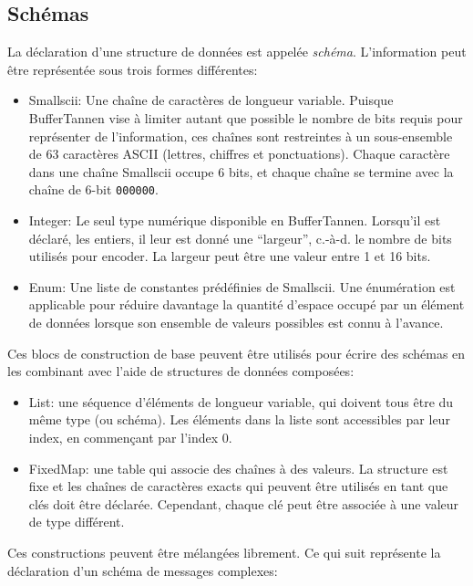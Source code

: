 \subsection{Schémas}
\setcounter{paragraph}{0}

La déclaration d'une structure de données est appelée \emph{schéma}. L'information peut être représentée sous trois formes différentes:

\begin{itemize}
\item Smallscii: Une chaîne de caractères de longueur variable. Puisque BufferTannen vise à limiter autant que possible le nombre de bits requis pour représenter de l'information, ces chaînes sont restreintes à un sous-ensemble de 63 caractères ASCII (lettres, chiffres et ponctuations). Chaque caractère dans une chaîne Smallscii occupe 6 bits, et chaque chaîne se termine avec la chaîne de 6-bit \verb+000000+.

\item Integer: Le seul type numérique disponible en BufferTannen. Lorsqu'il est déclaré, les entiers, il leur est donné une ``largeur'', c.-à-d. le nombre de bits utilisés pour encoder. La largeur peut être une valeur entre 1 et 16 bits.

\item Enum: Une liste de constantes prédéfinies de Smallscii. Une énumération est applicable pour réduire davantage la quantité d'espace occupé par un élément de données lorsque son ensemble de valeurs possibles est connu à l'avance.
\end{itemize}

Ces blocs de construction de base peuvent être utilisés pour écrire des schémas en les combinant avec l'aide de structures de données composées:

\begin{itemize}
\item List: une séquence d'éléments de longueur variable, qui doivent tous être du même type (ou schéma). Les éléments dans la liste sont accessibles par leur index, en commençant par l'index 0.
\item FixedMap: une table qui associe des chaînes à des valeurs. La structure est fixe et les chaînes de caractères exacts qui peuvent être utilisés en tant que clés doit être déclarée. Cependant, chaque clé peut être associée à une valeur de type différent.
\end{itemize}

Ces constructions peuvent être mélangées librement. Ce qui suit représente la déclaration d'un schéma de messages complexes:

